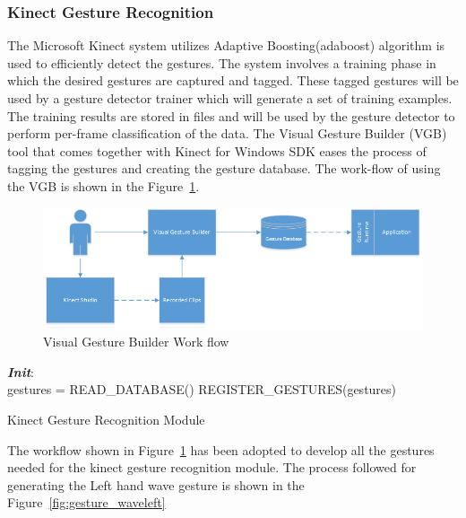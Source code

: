 \subsubsection{Kinect Gesture Recognition}
\label{sssec:kinect_gestures}
	The Microsoft Kinect system utilizes Adaptive Boosting(adaboost) algorithm \cite{Freund1997119} is used to efficiently detect the gestures. The system involves a training phase in which the desired gestures are captured and tagged. These tagged gestures will be used by a gesture detector trainer which will generate a set of training examples. The training results are stored in files and will be used by the gesture detector to perform per-frame classification of the data. The Visual Gesture Builder (VGB) tool that comes together with Kinect for Windows SDK eases the process of tagging the gestures and creating the gesture database. The work-flow of using the VGB is shown in the Figure~\ref{fig:vgb_workflow}.
\begin{figure}
\centering
\includegraphics[width=\textwidth]{assets/VisualGestureBuilder.png}
\caption[Visual Gesture Builder Work flow]{Visual Gesture Builder Work flow \cite{KinectSDK2014}}
\label{fig:vgb_workflow}
\end{figure}
\begin{algorithm}
 \textbf{\emph{Init}}:\\
 \quad gestures = READ\_DATABASE()\;
 \quad REGISTER\_GESTURES(gestures)\;
 \caption{Kinect Gesture Recognition Module}
 \label{alg:localize}
\end{algorithm}
The workflow shown in Figure~\ref{fig:vgb_workflow} has been adopted to develop all the gestures needed for the kinect gesture recognition module. The process followed for generating the Left hand wave gesture is shown in the Figure~\ref{fig:gesture_waveleft}
